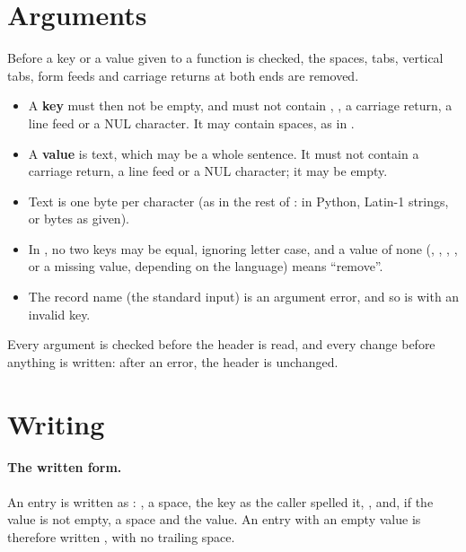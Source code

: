 \section{Arguments}
\label{sec:metadata-arguments}

Before a key or a value given to a function is checked, the spaces, tabs,
vertical tabs, form feeds and carriage returns at both ends are removed.
\begin{itemize}
\item A \textbf{key} must then not be empty, and must not contain \code{:},
  \code{\#}, a carriage return, a line feed or a NUL character. It may
  contain spaces, as in .
\item A \textbf{value} is text, which may be a whole sentence. It must not
  contain a carriage return, a line feed or a NUL character; it may be
  empty.
\item Text is one byte per character (as in the rest of \wfdbx{}: in
  Python, Latin-1 strings, or bytes as given).
\item In , no two keys may be equal, ignoring letter
  case, and a value of none (, , ,
  , or a missing value, depending on the language) means
  ``remove''.
\item The record name \code{-} (the standard input) is an argument error,
  and so is  with an invalid key.
\end{itemize}
Every argument is checked before the header is read, and every change
before anything is written: after an error, the header is unchanged.

\section{Writing}
\label{sec:metadata-writing}

\paragraph{The written form.} An entry is written as :
\code{\#}, a space, the key as the caller spelled it, \code{:}, and, if the
value is not empty, a space and the value. An entry with an empty value is
therefore written , with no trailing space.

